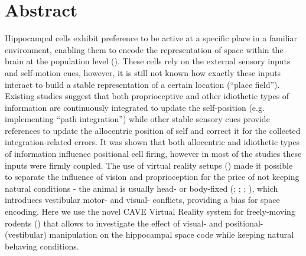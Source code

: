 \chapter{Abstract}

Hippocampal cells exhibit preference to be active at a specific place in a familiar environment, enabling them to encode the representation of space within the brain at the population level (\cite{OKEEFE1971171}). These cells rely on the external sensory inputs and self-motion cues, however, it is still not known how exactly these inputs interact to build a stable representation of a certain location (“place field”). Existing studies suggest that both proprioceptive and other idiothetic types of information are continuously integrated to update the self-position (e.g. implementing “path integration”) while other stable sensory cues provide references to update the allocentric position of self and correct it for the collected integration-related errors. It was shown that both allocentric and idiothetic types of information influence positional cell firing, however in most of the studies these inputs were firmly coupled. The use of virtual reality setups (\cite{Thurley2016}) made it possible to separate the influence of vision and proprioception for the price of not keeping natural conditions - the animal is usually head- or body-fixed (\cite{Holscher2005}; \cite{RavassardA.2013}; \cite{Jayakumar2018a}; \cite{Haas2019}), which introduces vestibular motor- and visual- conflicts, providing a bias for space encoding. Here we use the novel CAVE Virtual Reality system for freely-moving rodents (\cite{DelGrosso2018}) that allows to investigate the effect of visual- and positional- (vestibular) manipulation on the hippocampal space code while keeping natural behaving conditions.

